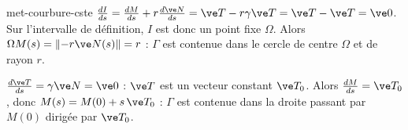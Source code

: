 \begin{corrige}{met-courbure-cste}
 $\frac{dI}{ds}=\frac{dM}{ds}+r\frac{d\ve N}{ds}=\ve T-r\gamma\ve T=\ve T-\ve T=\ve0$. Sur l'intervalle de définition, $I$ est donc un point fixe $\Omega$. Alors $\Omega M(s)=\|{-r\ve N(s)}\|=r$ : $\Gamma$ est contenue dans le cercle de centre $\Omega$ et de rayon $r$.

 $\frac{d\ve T}{ds}=\gamma\ve N=\ve0$ : $\ve T$ est un vecteur constant $\ve T_0$. Alors $\frac{dM}{ds}=\ve T_0$, donc $M(s)=M(0)+s\,\ve T_0$ : $\Gamma$ est contenue dans la droite passant par $M(0)$ dirigée par $\ve T_0$.
\end{corrige}
